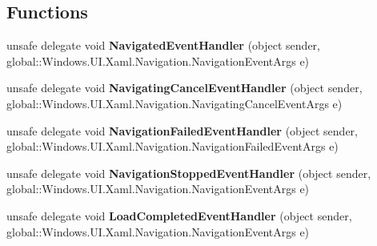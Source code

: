 \subsection*{Functions}
\begin{DoxyCompactItemize}
\item 
\mbox{\label{namespace_windows_1_1_u_i_1_1_xaml_1_1_navigation_ac05b599cd7839335b43626dc6441eb6f}} 
unsafe delegate void {\bfseries Navigated\+Event\+Handler} (object sender, global\+::\+Windows.\+U\+I.\+Xaml.\+Navigation.\+Navigation\+Event\+Args e)
\item 
\mbox{\label{namespace_windows_1_1_u_i_1_1_xaml_1_1_navigation_afd3a6e0c922a1f0741d1eacb897bffd8}} 
unsafe delegate void {\bfseries Navigating\+Cancel\+Event\+Handler} (object sender, global\+::\+Windows.\+U\+I.\+Xaml.\+Navigation.\+Navigating\+Cancel\+Event\+Args e)
\item 
\mbox{\label{namespace_windows_1_1_u_i_1_1_xaml_1_1_navigation_a50283b1af943b4321f5beecdea389c9a}} 
unsafe delegate void {\bfseries Navigation\+Failed\+Event\+Handler} (object sender, global\+::\+Windows.\+U\+I.\+Xaml.\+Navigation.\+Navigation\+Failed\+Event\+Args e)
\item 
\mbox{\label{namespace_windows_1_1_u_i_1_1_xaml_1_1_navigation_a0a5a4e99368ec106329b6a58fd8402d7}} 
unsafe delegate void {\bfseries Navigation\+Stopped\+Event\+Handler} (object sender, global\+::\+Windows.\+U\+I.\+Xaml.\+Navigation.\+Navigation\+Event\+Args e)
\item 
\mbox{\label{namespace_windows_1_1_u_i_1_1_xaml_1_1_navigation_a9e9a5fbc23df360382fa33baa5826b0c}} 
unsafe delegate void {\bfseries Load\+Completed\+Event\+Handler} (object sender, global\+::\+Windows.\+U\+I.\+Xaml.\+Navigation.\+Navigation\+Event\+Args e)
\end{DoxyCompactItemize}

